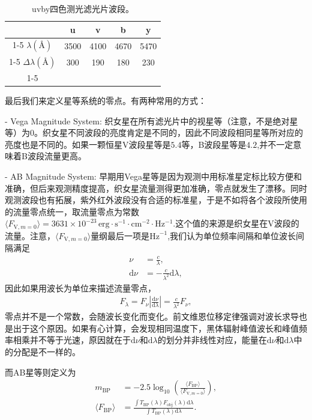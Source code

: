 \documentclass[../天体物理基础.tex]{subfiles}
\begin{document}
\begin{table}[htbp]
\centering
\caption{uvby四色测光滤光片波段。}
\begin{tabular}{c c c c c}
\hline
 & u & v & b & y\\
\cline{1-5}
$\lambda\left(\si{\angstrom}\right)$ & 3500 & 4100 & 4670 & 5470\\
\cline{1-5}
$\Delta{}\lambda\left(\si{\angstrom}\right)$ & 300 & 190 & 180 & 230\\
\cline{1-5}
\end{tabular}
\label{uvby四色测光滤光片波段。}
\end{table}

最后我们来定义星等系统的零点。有两种常用的方式：

- Vega Magnitude System: 织女星在所有滤光片中的视星等（注意，不是绝对星等）为0。织女星不同波段的亮度肯定是不同的，因此不同波段相同星等所对应的亮度也是不同的。如果一颗恒星V波段星等是$5.4$等，B波段星等是$4.2$,并不一定意味着B波段流量更高。

- AB Magnitude System: 早期用Vega星等是因为观测中用标准星定标比较方便和准确，但后来观测精度提高，织女星流量测得更加准确，零点就发生了漂移。同时观测波段也有拓展，紫外红外波段没有合适的标准星，于是不如将各个波段所使用的流量零点统一，取流量零点为常数$\langle F_{\text{V},m=0}\rangle=3631\times10^{-23}\,\mathrm{erg\cdot s^{-1}\cdot cm^{-2}\cdot Hz^{-1}}$.这个值的来源是织女星在V波段的流量。注意，$\langle{}F_{\text{V},m=0}\rangle$量纲最后一项是$\mathrm{Hz}^{-1}$,我们认为单位频率间隔和单位波长间隔满足
\begin{align}
\nu&=\frac{c}{\lambda},\\
\mathrm{d}\nu&=-\frac{c}{\lambda^{2}}\mathrm{d}\lambda,
\end{align}
因此如果用波长为单位来描述流量零点，
\begin{align}
F_{\lambda}=F_{\nu}\left\vert{}\frac{\mathrm{d}\nu}{\mathrm{d}\lambda}\right\vert{}=\frac{c}{\lambda^{2}}F_{\nu},
\end{align}
零点并不是一个常数，会随波长变化而变化。前文维恩位移定律强调对波长求导也是出于这个原因。如果有心计算，会发现相同温度下，黑体辐射峰值波长和峰值频率相乘并不等于光速，原因就在于$\mathrm{d}\nu$和$\mathrm{d}\lambda$的划分并非线性对应，能量在$\mathrm{d}\nu$和$\mathrm{d}\lambda$中的分配是不一样的。

而AB星等则定义为
\begin{align}
m_{\mathrm{BP}}&=-2.5\log_{10}(\frac{\langle F_{\mathrm{BP}}\rangle}{\langle F_{\text{V},m=0}\rangle}),\\
\langle F_{\mathrm{BP}}\rangle&=\frac{\int T_{\mathrm{BP}}(\lambda)F_{\text{obj}}(\lambda)\mathrm{d}\lambda}{\int T_{\mathrm{BP}}(\lambda)\mathrm{d}\lambda}.
\end{align}
\end{document}
